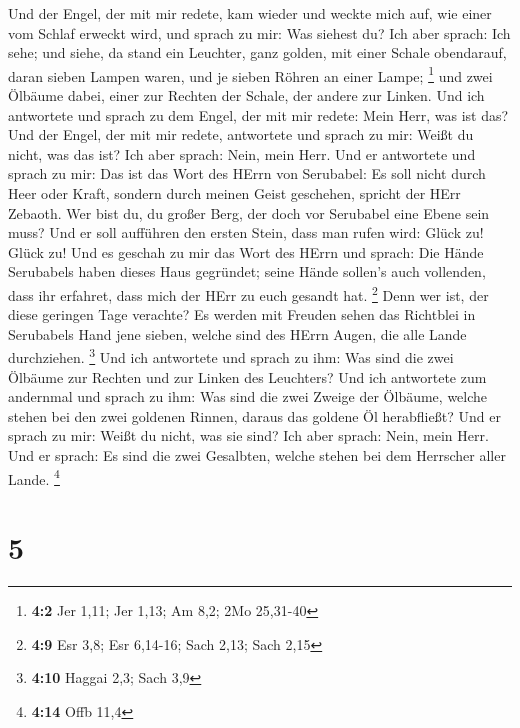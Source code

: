  Und der Engel, der mit mir redete, kam wieder und weckte
mich auf, wie einer vom Schlaf erweckt wird,  und sprach
zu mir: Was siehest du? Ich aber sprach: Ich sehe; und siehe, da stand
ein Leuchter, ganz golden, mit einer Schale obendarauf, daran sieben
Lampen waren, und je sieben Röhren an einer Lampe; \footnote{\textbf{4:2}
  Jer 1,11; Jer 1,13; Am 8,2; 2Mo 25,31-40}  und zwei
Ölbäume dabei, einer zur Rechten der Schale, der andere zur Linken.
 Und ich antwortete und sprach zu dem Engel, der mit mir
redete: Mein Herr, was ist das?  Und der Engel, der mit
mir redete, antwortete und sprach zu mir: Weißt du nicht, was das ist?
Ich aber sprach: Nein, mein Herr.  Und er antwortete und
sprach zu mir: Das ist das Wort des HErrn von Serubabel: Es soll nicht
durch Heer oder Kraft, sondern durch meinen Geist geschehen, spricht der
HErr Zebaoth.  Wer bist du, du großer Berg, der doch vor
Serubabel eine Ebene sein muss? Und er soll aufführen den ersten Stein,
dass man rufen wird: Glück zu! Glück zu!  Und es geschah
zu mir das Wort des HErrn und sprach:  Die Hände
Serubabels haben dieses Haus gegründet; seine Hände sollen's auch
vollenden, dass ihr erfahret, dass mich der HErr zu euch gesandt hat.
\footnote{\textbf{4:9} Esr 3,8; Esr 6,14-16; Sach 2,13; Sach 2,15}
 Denn wer ist, der diese geringen Tage verachte? Es
werden mit Freuden sehen das Richtblei in Serubabels Hand jene sieben,
welche sind des HErrn Augen, die alle Lande durchziehen. \footnote{\textbf{4:10}
  Haggai 2,3; Sach 3,9}  Und ich antwortete und sprach zu
ihm: Was sind die zwei Ölbäume zur Rechten und zur Linken des Leuchters?
 Und ich antwortete zum andernmal und sprach zu ihm: Was
sind die zwei Zweige der Ölbäume, welche stehen bei den zwei goldenen
Rinnen, daraus das goldene Öl herabfließt?  Und er sprach
zu mir: Weißt du nicht, was sie sind? Ich aber sprach: Nein, mein Herr.
 Und er sprach: Es sind die zwei Gesalbten, welche stehen
bei dem Herrscher aller Lande. \footnote{\textbf{4:14} Offb 11,4}

\hypertarget{section-4}{%
\section{5}\label{section-4}}

